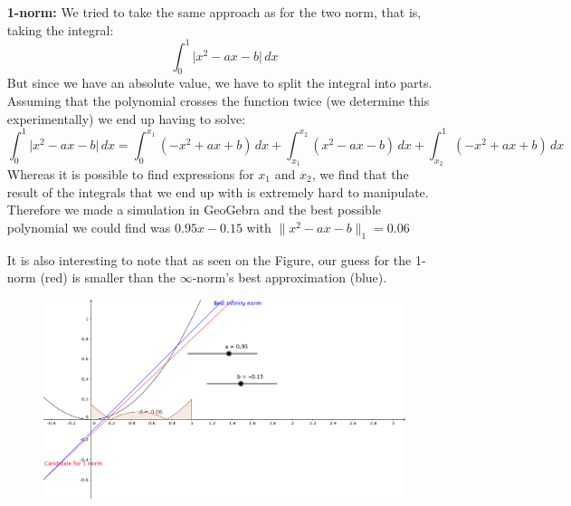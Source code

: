 \begin{solution}
\begin{enumerate}
  \item [{\bf 1-norm: }] We tried to take the same approach as for the
    two norm, that is, taking the integral:
    \begin{equation*}
      \int_0^1 \lvert x^2-ax-b \rvert \, dx
    \end{equation*}
    But since we have an absolute value, we have to split the integral
    into parts. Assuming that the polynomial crosses the function
    twice (we determine this experimentally) we end up having to
    solve:
    \begin{equation*}
      \int_0^1 \lvert x^2-ax-b \rvert \, dx = \int_0^{x_1} (-x^2+ax+b)
      \, dx + \int_{x_1}^{x_2} (x^2-ax-b) \, dx+ \int_{x_2}^1
      (-x^2+ax+b) \, dx
    \end{equation*}
    Whereas it is possible to find expressions for $x_1$ and $x_2$, we
    find that the result of the integrals that we end up with is
    extremely hard to manipulate. Therefore we made a simulation in
    GeoGebra and the best possible polynomial we could find was
    $0.95x-0.15$ with $\lVert x^2-ax-b \rVert_1 = 0.06$

    It is also interesting to note that as seen on the Figure, our
    guess for the 1-norm (red) is smaller than the $\infty$-norm's
    best approximation (blue).
\begin{figure}[h]
\centering
\includegraphics[scale=0.25]{task7.png}
\label{cranknic}
\end{figure}

\end{enumerate}
\end{solution}

 	

